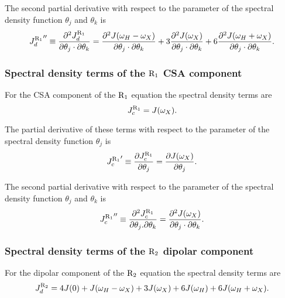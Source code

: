 \noindent The second partial derivative with respect to the parameter of the spectral density function $\theta_j$ and $\theta_k$ is
\begin{equation}
    {J_d^{\mathrm{R}_1}}'' \equiv \frac{\partial^2 J_d^{\mathrm{R}_1}}{\partial \theta_j \cdot \partial \theta_k}
        = \frac{\partial^2 J(\omega_H - \omega_X)}{\partial \theta_j \cdot \partial \theta_k}
        + 3 \frac{\partial^2 J(\omega_X)}{\partial \theta_j \cdot \partial \theta_k}
        + 6 \frac{\partial^2 J(\omega_H + \omega_X)}{\partial \theta_j \cdot \partial \theta_k}.  \label{eq: J terms: JR1d"}
\end{equation}


\subsubsection{Spectral density terms of the $\mathrm{R}_1$ CSA component}

For the CSA component of the $\mathrm{R}_1$ equation the spectral density terms are
\begin{equation}
    J_c^{\mathrm{R}_1} = J(\omega_X).  \label{eq: J terms: JR1c}
\end{equation}

\noindent The partial derivative of these terms with respect to the parameter of the spectral density function $\theta_j$ is
\begin{equation}
    {J_c^{\mathrm{R}_1}}' \equiv \frac{\partial J_c^{\mathrm{R}_1}}{\partial \theta_j}
        = \frac{\partial J(\omega_X)}{\partial \theta_j}.  \label{eq: J terms: JR1c'}
\end{equation}

\noindent The second partial derivative with respect to the parameter of the spectral density function $\theta_j$ and $\theta_k$ is
\begin{equation}
    {J_c^{\mathrm{R}_1}}'' \equiv \frac{\partial^2 J_c^{\mathrm{R}_1}}{\partial \theta_j . \partial \theta_k}
        = \frac{\partial^2 J(\omega_X)}{\partial \theta_j \cdot \partial \theta_k}.  \label{eq: J terms: JR1c"}
\end{equation}


\subsubsection{Spectral density terms of the $\mathrm{R}_2$ dipolar component}

For the dipolar component of the $\mathrm{R}_2$ equation the spectral density terms are
\begin{equation}
    J_d^{\mathrm{R}_2} = 4J(0) + J(\omega_H - \omega_X) + 3J(\omega_X) + 6J(\omega_H) + 6J(\omega_H + \omega_X).  \label{eq: J terms: JR2d}
\end{equation}

